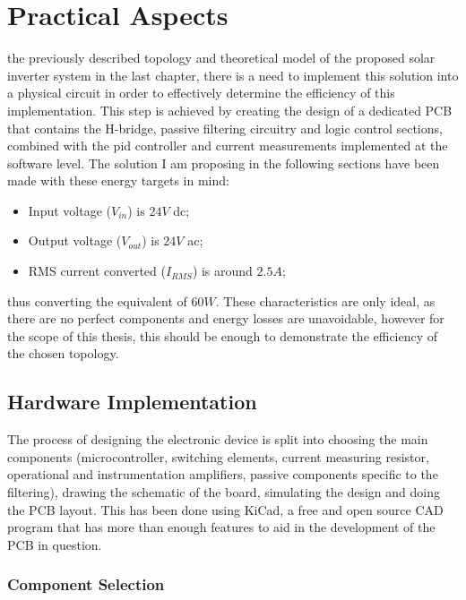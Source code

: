 \chapter{Practical Aspects}
\label{chap:practical}

 the previously described topology and theoretical model of the proposed solar inverter system in the last chapter, there is a need to implement this solution into a physical circuit in order to effectively determine the efficiency of this implementation.
This step is achieved by creating the design of a dedicated PCB that contains the \gls{H-bridge}, passive filtering circuitry and logic control sections, combined with the \gls{pid} controller and current measurements implemented at the software level.
The solution I am proposing in the following sections have been made with these energy targets in mind:

\begin{itemize}
    \item Input voltage ($V_{in}$) is $24V$ \gls{dc};
    \item Output voltage ($V_{out}$) is $24V$ \gls{ac};
    \item RMS current converted ($I_{RMS}$) is around $2.5A$;
\end{itemize}

thus converting the equivalent of $60W$.
These characteristics are only ideal, as there are no perfect components and energy losses are unavoidable, however for the scope of this thesis, this should be enough to demonstrate the efficiency of the chosen topology.

\section{Hardware Implementation}

The process of designing the electronic device is split into choosing the main components (microcontroller, switching elements, current measuring resistor, operational and instrumentation amplifiers, passive components specific to the filtering), drawing the schematic of the board, simulating the design and doing the PCB layout.
This has been done using KiCad, a free and open source CAD program that has more than enough features to aid in the development of the PCB in question.

\subsection{Component Selection}

